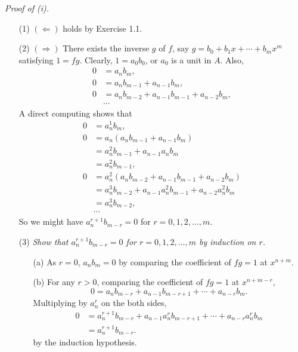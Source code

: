 \documentclass{article}
\begin{document}
\emph{Proof of (i).}
\begin{enumerate}
\item[(1)]
  $(\Longleftarrow)$ holds by Exercise 1.1.

\item[(2)]
  $(\Longrightarrow)$
  There exists the inverse $g$ of $f$, say $g = b_0 + b_1 x + \cdots + b_m x^m$
  satisfying
  $1 = fg$.
  Clearly, $1 = a_0 b_0$, or $a_0$ is a unit in $A$.
  Also,
  \begin{align*}
    0
    &= a_n b_m, \\
    0
    &= a_n b_{m-1} + a_{n-1} b_m, \\
    0
    &= a_n b_{m-2} + a_{n-1} b_{m-1} + a_{n-2} b_m, \\
    & \cdots
  \end{align*}
  A direct computing shows that
  \begin{align*}
    0
    &= a_n^{1} b_m, \\
    0
    &= a_n (a_n b_{m-1} + a_{n-1} b_m) \\
    &= a_n^{2} b_{m-1} + a_{n-1} a_n b_m \\
    &= a_n^{2} b_{m-1}, \\
    0
    &= a_n^{2} (a_n b_{m-2} + a_{n-1} b_{m-1} + a_{n-2} b_m) \\
    &= a_n^{3} b_{m-2} + a_{n-1} a_n^{2} b_{m-1} + a_{n-2} a_n^{2} b_m \\
    &= a_n^{3} b_{m-2}, \\
    & \cdots
  \end{align*}
  So we might have $a_n^{r+1} b_{m-r} = 0$ for $r = 0, 1, 2, \ldots, m$.

\item[(3)]
  \emph{Show that $a_n^{r+1} b_{m-r} = 0$ for $r = 0, 1, 2, \ldots, m$
  by induction on $r$.}
  \begin{enumerate}
  \item[(a)]
    As $r = 0$, $a_n b_m = 0$ by comparing the coefficient of $fg = 1$ at $x^{n+m}$.

  \item[(b)]
    For any $r > 0$, comparing the coefficient of $fg = 1$ at $x^{n+m-r}$,
    \[
      0 = a_n b_{m-r} + a_{n-1} b_{m-r+1} + \cdots + a_{n-r} b_m.
    \]
    Multiplying by $a_n^r$ on the both sides,
    \begin{align*}
      0
      &= a_n^{r+1} b_{m-r} + a_{n-1} a_n^{r} b_{m-r+1} + \cdots + a_{n-r} a_n^{r} b_m \\
      &= a_n^{r+1} b_{m-r}.
    \end{align*}
    by the induction hypothesis.
  \end{enumerate}


\end{enumerate}
\end{document}
